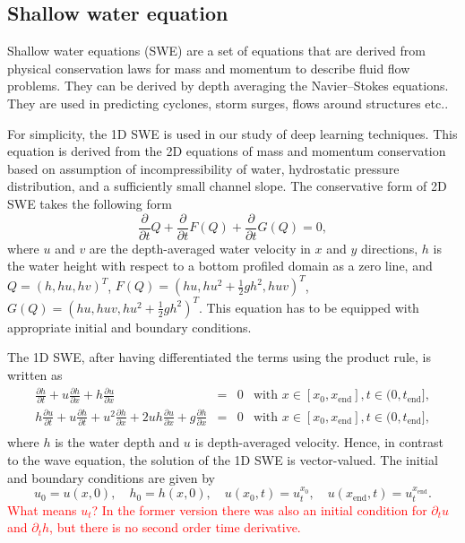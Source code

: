 \subsection{Shallow water equation}

Shallow water equations (SWE) are a set of equations that are derived from physical conservation laws for mass and momentum to describe fluid flow problems. They can be derived by depth averaging 
the Navier--Stokes equations. They are used in predicting cyclones, storm surges, flows around structures etc..

For simplicity, the 1D SWE is used in our study of deep learning techniques. 
This equation is derived from the 2D equations of mass and momentum conservation based on assumption
of incompressibility of water, hydrostatic pressure distribution, and a sufficiently small channel slope. 
The conservative form of 2D SWE takes the following form   
\[
\frac{\partial}{\partial t}Q + \frac{\partial }{\partial t} F(Q) + \frac{\partial }{\partial t} G(Q) = 0,
\]
where $u$ and $v$ are the depth-averaged water velocity in $x$ and $y$ directions, $h$ is the water height 
with respect to a bottom profiled domain as a zero line, and 
$Q = (h, hu, hv)^T$, $F(Q) = (hu, hu^2+ \frac{1}{2}gh^2, huv)^T$, $G(Q) =(hu, huv, hu^2+ \frac{1}{2}gh^2)^T$.
This equation has to be equipped with appropriate initial and boundary conditions. 


The 1D SWE, after having differentiated the terms using the product rule, is written as
\begin{equation}\label{eq:swe}
\begin{array}{rcll}
\displaystyle\frac{\partial h }{\partial t} + u \frac{\partial h }{\partial x} + h \frac{\partial u }{\partial x}  &=& 0
& \mbox{with } x \in [x_0, x_{\mathrm{end}}], t \in (0, t_{\mathrm{end}}],\\[1em]
\displaystyle  h \frac{\partial u }{\partial t} + u \frac{\partial h }{\partial t}  + u^2 \frac{\partial h }{\partial x} + 2uh\frac{\partial u }{\partial x} + g \frac{\partial h }{\partial x} &=& 0 & \mbox{with } x \in [x_0, x_{\mathrm{end}}], t \in (0, t_{\mathrm{end}}],\\[1em]
\end{array}
\end{equation}
where $h$ is the water depth and $u$ is depth-averaged velocity. Hence, in contrast to the wave equation, 
the solution of the 1D SWE is vector-valued. The initial  and boundary 
conditions are given by 
\begin{equation}\label{eq:swe_ic_bc}
u_0 =  u(x,0), \quad  h_0 = h(x,0),\quad 
u(x_0,t) = u_t^{x_0}, \quad u(x_{\mathrm{end}}, t) = u_t^{x_{\mathrm{end}}}. 
\end{equation}
\textcolor{red}{What means $u_t$? In the former version there was also an initial condition for 
$\partial_tu$ and $\partial_th$, but there is no second order time derivative.}
